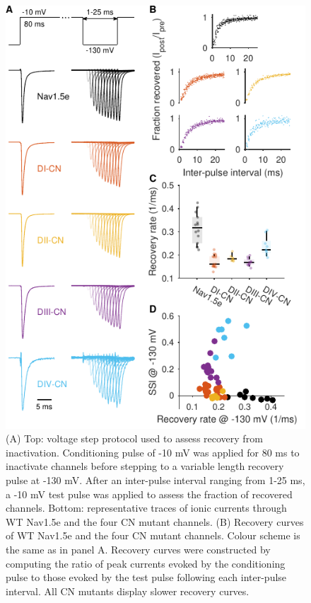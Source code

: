 \begin{figure}[t]
\begin{minipage}[c]{85mm}
    \centering
    \includegraphics[width=\textwidth]{Figures/AppendixA/figure08.pdf}
\end{minipage}\hfill
\begin{minipage}[c]{70mm}
    \caption{
    (A) Top: voltage step protocol used to assess recovery from inactivation. Conditioning pulse of -10 mV was applied for 80 ms to inactivate channels before stepping to a variable length recovery pulse at -130 mV. After an inter-pulse interval ranging from 1-25 ms, a -10 mV test pulse was applied to assess the fraction of recovered channels. Bottom: representative traces of ionic currents through WT Nav1.5e and the four CN mutant channels.
    (B) Recovery curves of WT Nav1.5e and the four CN mutant channels. Colour scheme is the same as in panel A. Recovery curves were constructed by computing the ratio of peak currents evoked by the conditioning pulse to those evoked by the test pulse following each inter-pulse interval. All CN mutants display slower recovery curves.
}
\end{minipage}
\end{figure}
